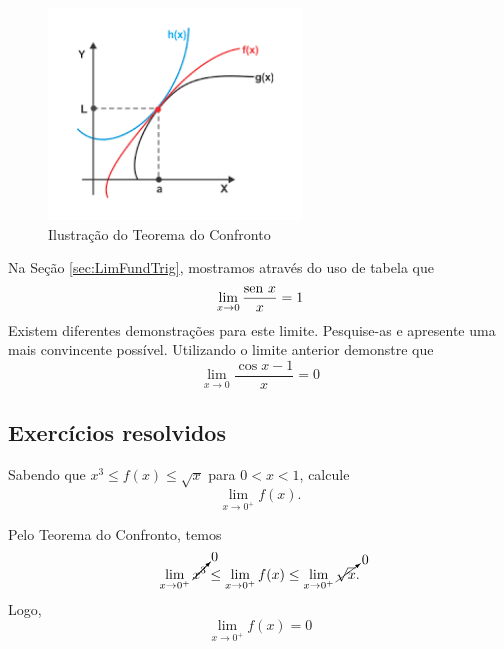 \cleardoublepage\documentclass[../main.tex]{subfiles}
\begin{document}

\begin{figure}[htb]
  \centering
  \includegraphics[width=0.6\textwidth]{fig_lim/TeorConfronto}
 \caption{Ilustração do Teorema do Confronto}
  \label{fig:TeorConfronto}
\end{figure}

 Na Seção \ref{sec:LimFundTrig}, mostramos através do uso de tabela que $$\lim_{x\to 0} \frac{\operatorname{sen}\, x}{x}=1$$
Existem diferentes demonstrações para este limite. Pesquise-as e apresente uma mais convincente possível. Utilizando o limite anterior demonstre que $$\lim_{x\to 0} \frac{\cos x -1}{x}=0$$
\subsection{Exercícios resolvidos}

\begin{exeresol}
  Sabendo que $x^3 \leq f(x) \leq \sqrt{x}$ para $0 < x < 1$, calcule
  \begin{equation*}
    \lim_{x\to 0^+} f(x).
  \end{equation*}
  \begin{resol}
  Pelo Teorema do Confronto, temos
  \begin{equation*}
    \lim_{x\to 0^+} \cancelto{0}{x^3} \leq \lim_{x\to 0^+} f(x) \leq \lim_{x\to 0^+} \cancelto{0}{\sqrt{x}}.
  \end{equation*}
  Logo,
  \begin{equation*}
    \lim_{x\to 0^+} f(x) = 0
  \end{equation*}
\end{resol}
\end{exeresol}
\end{document}
